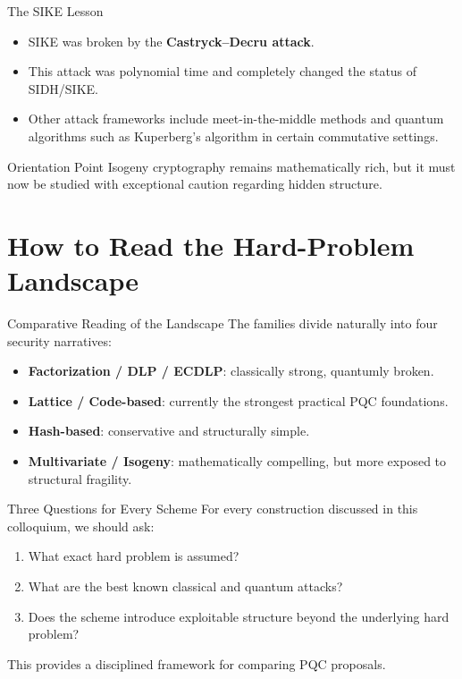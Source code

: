 \documentclass[aspectratio=169]{beamer}
\begin{document}
	\begin{frame}{The SIKE Lesson}
		\begin{itemize}
			\item SIKE was broken by the \textbf{Castryck--Decru attack}.
			\item This attack was polynomial time and completely changed the status of SIDH/SIKE.
			\item Other attack frameworks include meet-in-the-middle methods and quantum algorithms such as Kuperberg's algorithm in certain commutative settings.
		\end{itemize}
		
		\begin{block}{Orientation Point}
			Isogeny cryptography remains mathematically rich, but it must now be studied with exceptional caution regarding hidden structure.
		\end{block}
	\end{frame}
	
	\section{How to Read the Hard-Problem Landscape}
	
	\begin{frame}{Comparative Reading of the Landscape}
		The families divide naturally into four security narratives:
		\begin{itemize}
			\item \textbf{Factorization / DLP / ECDLP}: classically strong, quantumly broken.
			\item \textbf{Lattice / Code-based}: currently the strongest practical PQC foundations.
			\item \textbf{Hash-based}: conservative and structurally simple.
			\item \textbf{Multivariate / Isogeny}: mathematically compelling, but more exposed to structural fragility.
		\end{itemize}
	\end{frame}
	
	\begin{frame}{Three Questions for Every Scheme}
		For every construction discussed in this colloquium, we should ask:
		\begin{enumerate}
			\item What exact hard problem is assumed?
			\item What are the best known classical and quantum attacks?
			\item Does the scheme introduce exploitable structure beyond the underlying hard problem?
		\end{enumerate}
		
		\vspace{0.75em}
		This provides a disciplined framework for comparing PQC proposals.
	\end{frame}
	
\end{document}
